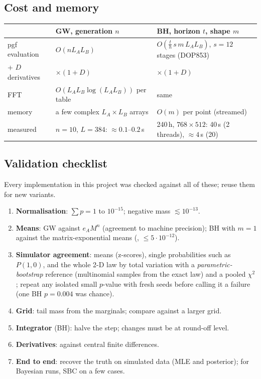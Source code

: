 \documentclass[11pt]{article}
\theoremstyle{definition}
\theoremstyle{remark}
\newcommand{\code}[1]{\texttt{\detokenize{#1}}}
\begin{document}
\subsection{Cost and memory}
\begin{center}\small
\begin{tabular}{@{}lll@{}}\toprule
 & GW, generation $n$ & BH, horizon $t$, shape $m$ \\\midrule
pgf evaluation & $O(nL_AL_B)$ & $O(\frac{t}{h}\,s\,m\,L_AL_B)$, $s=12$ stages (DOP853) \\
+ $D$ derivatives & $\times(1+D)$ & $\times(1+D)$ \\
FFT & $O(L_AL_B\log(L_AL_B))$ per table & same \\
memory & a few complex $L_A\times L_B$ arrays & $O(m)$ per point (streamed) \\
measured & $n=10$, $L=384$: $\approx0.1$--$0.2$\,s & 240\,h, $768\times512$: 40\,s (2 threads), $\approx4$\,s (20) \\\bottomrule
\end{tabular}
\end{center}

\subsection{Validation checklist}
Every implementation in this project was checked against all of these; reuse them for new variants.
\begin{enumerate}
\item \textbf{Normalisation}: $\sum p=1$ to $10^{-15}$; negative mass $\lesssim10^{-13}$.
\item \textbf{Means}: GW against $e_AM^n$ (agreement to machine precision); BH with $m=1$ against the matrix-exponential means (\code{expected_counts}, $\le5\cdot10^{-12}$).
\item \textbf{Simulator agreement}: means (z-scores), single probabilities such as $P(1,0)$, and the whole 2-D law by total variation with a \emph{parametric-bootstrap} reference (multinomial samples from the exact law) and a pooled $\chi^2$; repeat any isolated small $p$-value with fresh seeds before calling it a failure (one BH $p=0.004$ was chance).
\item \textbf{Grid}: tail mass from the marginals; compare against a larger grid.
\item \textbf{Integrator} (BH): halve the step; changes must be at round-off level.
\item \textbf{Derivatives}: against central finite differences.
\item \textbf{End to end}: recover the truth on simulated data (MLE and posterior); for Bayesian runs, SBC on a few cases.
\end{enumerate}
\end{document}
